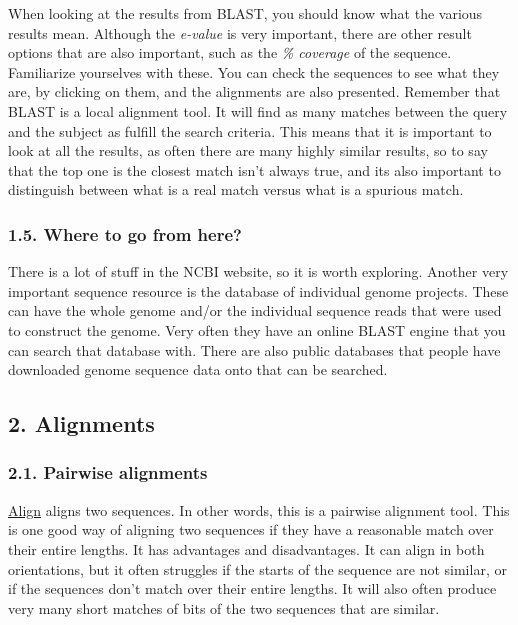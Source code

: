 \documentclass[]{article}
\begin{document}
When looking at the results from BLAST, you should know what the various
results mean. Although the \emph{e-value} is very important, there are
other result options that are also important, such as the \emph{\%
coverage} of the sequence. Familiarize yourselves with these. You can
check the sequences to see what they are, by clicking on them, and the
alignments are also presented. Remember that BLAST is a local alignment
tool. It will find as many matches between the query and the subject as
fulfill the search criteria. This means that it is important to look at
all the results, as often there are many highly similar results, so to
say that the top one is the closest match isn't always true, and its
also important to distinguish between what is a real match versus what
is a spurious match.

\subsubsection{1.5. Where to go from here?}\label{where-to-go-from-here}

There is a lot of stuff in the NCBI website, so it is worth exploring.
Another very important sequence resource is the database of individual
genome projects. These can have the whole genome and/or the individual
sequence reads that were used to construct the genome. Very often they
have an online BLAST engine that you can search that database with.
There are also public databases that people have downloaded genome
sequence data onto that can be searched.

\subsection{2. Alignments}\label{alignments}

\subsubsection{2.1. Pairwise alignments}\label{pairwise-alignments}

\href{http://blast.ncbi.nlm.nih.gov/Blast.cgi?PAGE_TYPE=BlastSearch\&BLAST_SPEC=blast2seq\&LINK_LOC=align2seq}{Align}
aligns two sequences. In other words, this is a pairwise alignment tool.
This is one good way of aligning two sequences if they have a reasonable
match over their entire lengths. It has advantages and disadvantages. It
can align in both orientations, but it often struggles if the starts of
the sequence are not similar, or if the sequences don't match over their
entire lengths. It will also often produce very many short matches of
bits of the two sequences that are similar.
\end{document}

